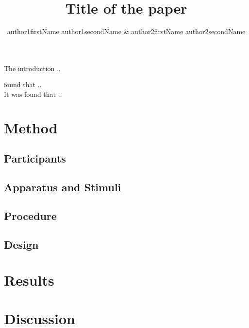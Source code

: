 \documentclass[man, 12pt]{apa6}
\title{Title of the paper}
\author{author1firstName author1secondName \& author2firstName author2secondName}
\affiliation{Department of Psychology, University of XXX}
\begin{document}
\maketitle
The introduction .. \textcite{botvinick2001conflict} 

\textcite{botvinick2001conflict} found that .. \\
It was found that .. \parencite[][]{simon1969reactions, eriksen1974effects, stroop1935studies} 

\section{Method}
\subsection{Participants}
\subsection{Apparatus and Stimuli}
\subsection{Procedure}

\subsection{Design}

\section{Results}

\section{Discussion}

\printbibliography
\end{document}
